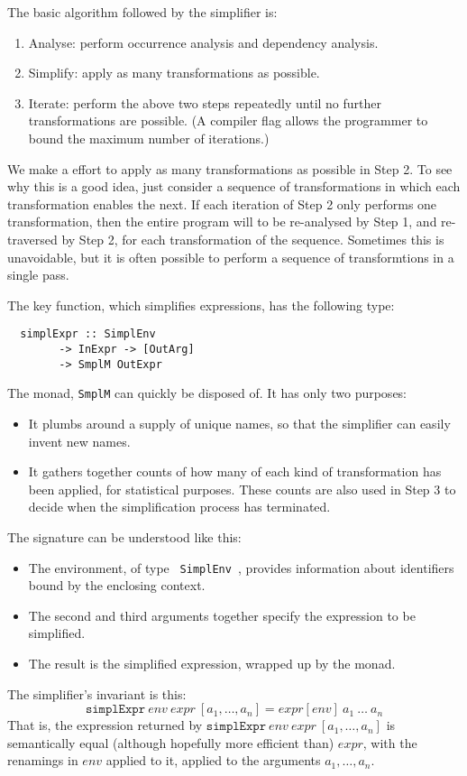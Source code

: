 \documentclass[11pt]{article}
\begin{document}
The basic algorithm followed by the simplifier is:
\begin{enumerate}
\item Analyse: perform occurrence analysis and dependency analysis.
\item Simplify: apply as many transformations as possible.
\item Iterate: perform the above two steps repeatedly until no further transformations are possible.
(A compiler flag allows the programmer to bound the maximum number of iterations.)
\end{enumerate}
We make a effort to apply as many transformations as possible in Step
2.  To see why this is a good idea, just consider a sequence of
transformations in which each transformation enables the next.  If
each iteration of Step 2 only performs one transformation, then the
entire program will to be re-analysed by Step 1, and re-traversed by
Step 2, for each transformation of the sequence.  Sometimes this is
unavoidable, but it is often possible to perform a sequence of
transformtions in a single pass.

The key function, which simplifies expressions, has the following type:
\begin{lstlisting}
  simplExpr :: SimplEnv
	    -> InExpr -> [OutArg]
	    -> SmplM OutExpr 
\end{lstlisting}
The monad, \texttt{SmplM} can quickly be disposed of.  It has only two purposes:
\begin{itemize}
\item It plumbs around a supply of unique names, so that the simplifier can
easily invent new names.
\item It gathers together counts of how many of each kind of transformation
has been applied, for statistical purposes.  These counts are also used
in Step 3 to decide when the simplification process has terminated.
\end{itemize}

The signature can be understood like this:
\begin{itemize}
\item The environment, of type \texttt{ SimplEnv }, provides information about
identifiers bound by the enclosing context.
\item The second and third arguments together specify the expression to be simplified.
\item The result is the simplified expression, wrapped up by the monad.
\end{itemize}
The simplifier's invariant is this:
$$
\texttt{simplExpr}~env~expr~[a_1,\ldots,a_n] = expr[env]~a_1~\ldots~a_n
$$
That is, the expression returned by $\texttt{simplExpr}~env~expr~[a_1,\ldots,a_n]$
is semantically equal (although hopefully more efficient than)
$expr$, with the renamings in $env$ applied to it, applied to the arguments
$a_1,\ldots,a_n$.
\end{document}
